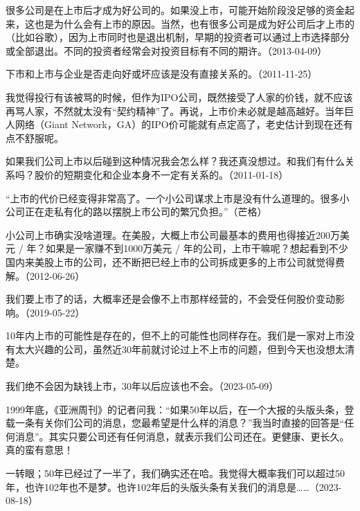 
很多公司是在上市后才成为好公司的。如果没上市，可能开始阶段没足够的资金起来，这也是为什么会有上市的原因。当然，也有很多公司是成为好公司后才上市的（比如谷歌），因为上市同时也是退出机制，早期的投资者可以通过上市选择部分或全部退出。不同的投资者经常会对投资目标有不同的期许。（2013-04-09）


下市和上市与企业是否走向好或坏应该是没有直接关系的。（2011-11-25）


我觉得投行有该被骂的时候，但作为IPO公司，既然接受了人家的价钱，就不应该再骂人家，不然就太没有“契约精神”了。再说，上市价未必就是越高越好。当年巨人网络（Giant Network，GA）的IPO价可能就有点定高了，老史估计到现在还有点不舒服呢。

如果我们公司上市以后碰到这种情况我会怎么样？我还真没想过。和我们有什么关系吗？股价的短期变化和企业本身不一定有关系的。（2011-01-18）

“上市的代价已经变得非常高了。一个小公司谋求上市是没有什么道理的。很多小公司正在走私有化的路以摆脱上市公司的繁冗负担。”（芒格）

小公司上市确实没啥道理。在美股，大概上市公司最基本的费用也得接近200万美元 / 年？如果是一家赚不到1000万美元 / 年的公司，上市干嘛呢？想起看到不少国内来美股上市的公司，还不断把已经上市的公司拆成更多的上市公司就觉得费解。（2012-06-26）

我们要上市了的话，大概率还是会像不上市那样经营的，不会受任何股价变动影响。（2019-05-22）

10年内上市的可能性是存在的，但不上的可能性也同样存在。我们是一家对上市没有太大兴趣的公司，虽然近30年前就讨论过上不上市的问题，但到今天也没想太清楚。

我们绝不会因为缺钱上市，30年以后应该也不会。（2023-05-09）

1999年底，《亚洲周刊》的记者问我：“如果50年以后，在一个大报的头版头条，登载一条有关你们公司的消息，您最希望是什么样的消息？”我当时直接的回答是“任何消息”。其实只要公司还有任何消息，就表示我们公司还在。更健康、更长久。真的蛮有意思！

一转眼；50年已经过了一半了，我们确实还在哈。我觉得大概率我们可以超过50年，也许102年也不是梦。也许102年后的头版头条有关我们的消息是……（2023-08-18）
